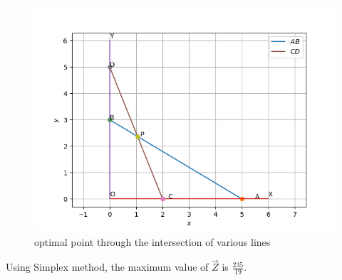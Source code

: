 \documentclass[journal,12pt,twocolumn]{IEEEtran}
\begin{document}
\begin{figure}[h]
\includegraphics[width=\columnwidth]{Figure_1.png}
\caption{optimal point through the intersection of various lines}
\label{fig:Figure_1}
\end{figure}
Using Simplex method, the maximum value of $\vec{Z}$ is $\frac{235}{19}$.
\end{document}

